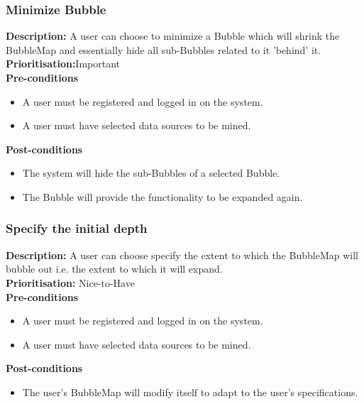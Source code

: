 \documentclass[hidelinks,english]{article}
\begin{document}
    		\subsubsection{Minimize Bubble}
				\textbf{Description:}  A user can choose to minimize a Bubble which will shrink the BubbleMap and essentially hide all sub-Bubbles related to it 'behind' it.\\
    			\textbf{Prioritisation:}Important\\
    			\textbf{Pre-conditions}
			    \begin{itemize}
			        \item A user must be registered and logged in on the system.
			        \item A user must have selected data sources to be mined.
			    \end{itemize}
			    \textbf{Post-conditions}
			     \begin{itemize}
			        \item The system will hide the sub-Bubbles of a selected Bubble.
			       \item The Bubble will provide the functionality to be expanded again.
			    \end{itemize}
    		\subsubsection{Specify the initial depth}
				\textbf{Description:}  A user can choose specify the extent to which the BubbleMap will bubble out i.e. the extent to which it will expand.\\
			    \textbf{Prioritisation:} Nice-to-Have\\
      			\textbf{Pre-conditions}
			    \begin{itemize}
			        \item A user must be registered and logged in on the system.
			        \item A user must have selected data sources to be mined.
			    \end{itemize}
    			\textbf{Post-conditions}
     			\begin{itemize}
        			\item The user's BubbleMap will modify itself to adapt to the user's specifications.
    			\end{itemize}
\end{document}
